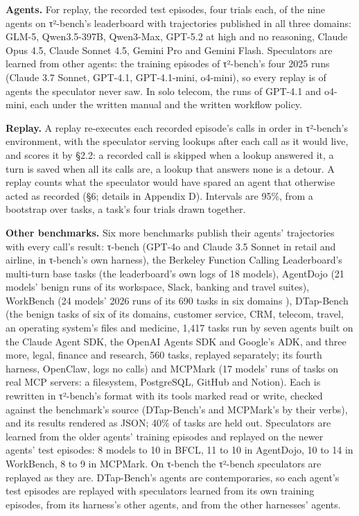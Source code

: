 \documentclass[10pt,twocolumn,letterpaper]{article}
\newcommand{\runin}[1]{{\sffamily\bfseries\color{accent}#1}}
\begin{document}
\runin{Agents.} For replay, the recorded test episodes, four trials each, of the nine agents on τ²-bench's leaderboard with trajectories published in all three domains: GLM-5, Qwen3.5-397B, Qwen3-Max, GPT-5.2 at high and no reasoning, Claude Opus 4.5, Claude Sonnet 4.5, Gemini Pro and Gemini Flash. Speculators are learned from other agents: the training episodes of τ²-bench's four 2025 runs (Claude 3.7 Sonnet, GPT-4.1, GPT-4.1-mini, o4-mini), so every replay is of agents the speculator never saw. In solo telecom, the runs of GPT-4.1 and o4-mini, each under the written manual and the written workflow policy.

\runin{Replay.} A replay re-executes each recorded episode's calls in order in τ²-bench's environment, with the speculator serving lookups after each call as it would live, and scores it by §2.2: a recorded call is skipped when a lookup answered it, a turn is saved when all its calls are, a lookup that answers none is a detour. A replay counts what the speculator would have spared an agent that otherwise acted as recorded (§6; details in Appendix D). Intervals are 95\%, from a bootstrap over tasks, a task's four trials drawn together.

\runin{Other benchmarks.} Six more benchmarks publish their agents' trajectories with every call's result: τ-bench \citep{yao2024taubench} (GPT-4o and Claude 3.5 Sonnet in retail and airline, in τ-bench's own harness), the Berkeley Function Calling Leaderboard's multi-turn base tasks \citep{patil2025bfcl} (the leaderboard's own logs of 18 models), AgentDojo \citep{debenedetti2024agentdojo} (21 models' benign runs of its workspace, Slack, banking and travel suites), WorkBench \citep{styles2024workbench} (24 models' 2026 runs of its 690 tasks in six domains \citep{styles2026workbenchrevisited}), DTap-Bench \citep{chen2026dtap} (the benign tasks of six of its domains, customer service, CRM, telecom, travel, an operating system's files and medicine, 1,417 tasks run by seven agents built on the Claude Agent SDK, the OpenAI Agents SDK and Google's ADK, and three more, legal, finance and research, 560 tasks, replayed separately; its fourth harness, OpenClaw, logs no calls) and MCPMark \citep{wu2025mcpmark} (17 models' runs of tasks on real MCP servers: a filesystem, PostgreSQL, GitHub and Notion). Each is rewritten in τ²-bench's format with its tools marked read or write, checked against the benchmark's source (DTap-Bench's and MCPMark's by their verbs), and its results rendered as JSON; 40\% of tasks are held out. Speculators are learned from the older agents' training episodes and replayed on the newer agents' test episodes: 8 models to 10 in BFCL, 11 to 10 in AgentDojo, 10 to 14 in WorkBench, 8 to 9 in MCPMark. On τ-bench the τ²-bench speculators are replayed as they are. DTap-Bench's agents are contemporaries, so each agent's test episodes are replayed with speculators learned from its own training episodes, from its harness's other agents, and from the other harnesses' agents.
\end{document}
